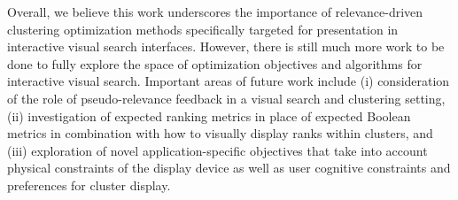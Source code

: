 Overall, we believe this work underscores the importance of relevance-driven clustering optimization methods specifically targeted for presentation in interactive visual search interfaces.  However, there is still much more work to be done to fully explore the space of optimization objectives and algorithms for interactive visual search.  Important areas of future work include (i) consideration of the role of pseudo-relevance feedback in a visual search and clustering setting, (ii) investigation of expected ranking metrics in place of expected Boolean metrics in combination with how to visually display ranks within clusters, and (iii) exploration of novel application-specific objectives that take into account physical constraints of the display device as well as user cognitive constraints and preferences for cluster display.



